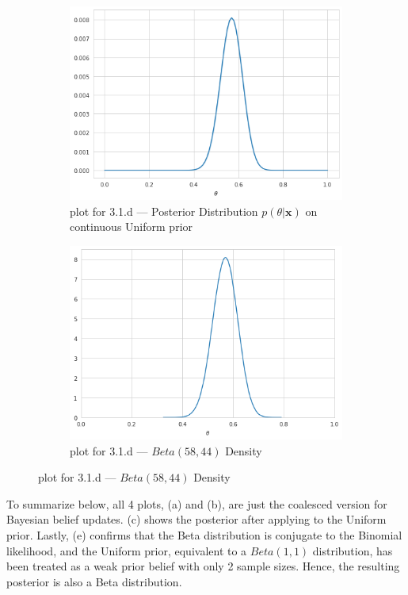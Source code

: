 \documentclass[11pt, letterpaper]{article}
\begin{document}
\begin{figure}[!b]
\begin{subfigure}{.49\textwidth}
        \includegraphics[scale=0.44]{hw2_3.1.d.png}
        \caption{plot for 3.1.d --- Posterior Distribution $p(\theta|\mathbf{x})$ on continuous Uniform prior}
    \end{subfigure}
    \begin{subfigure}{.49\textwidth}
        \centering
        \includegraphics[scale=0.44]{hw2_3.1.e.png}
        \caption{plot for 3.1.d --- $Beta(58, 44)$ Density}
    \end{subfigure}
\end{figure}

To summarize below, all 4 plots, (a) and (b), are just the coalesced version for Bayesian belief updates. (c) shows the posterior
after applying to the Uniform prior. Lastly, (e) confirms that the Beta distribution is conjugate to the Binomial likelihood, and
the Uniform prior, equivalent to a $Beta (1, 1)$ distribution, has been treated as a weak prior belief with only 2 sample sizes.
Hence, the resulting posterior is also a Beta distribution.
\end{document}
